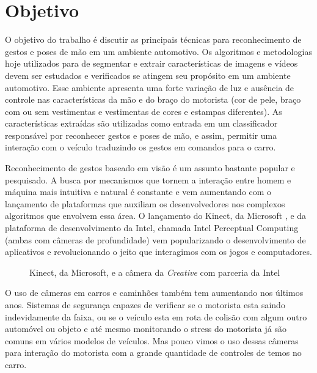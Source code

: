 \chapter{Objetivo}

O objetivo do trabalho é discutir as principais técnicas para reconhecimento de gestos e poses de mão em um ambiente automotivo.
Os algoritmos e metodologias hoje utilizados para de segmentar e extrair características de imagens e vídeos devem ser estudados e verificados se atingem seu propósito em um ambiente automotivo. Esse ambiente apresenta uma forte variação de luz e ausência de controle nas características da mão e do braço do motorista (cor de pele, braço com ou sem vestimentas e vestimentas de cores e estampas diferentes). As características extraídas são utilizadas como entrada em um classificador responsável por reconhecer gestos e poses de mão, e assim, permitir uma interação com o veículo traduzindo os gestos em comandos para o carro.


Reconhecimento de gestos baseado em visão é um assunto bastante popular e pesquisado. A busca por mecanismos que tornem a interação entre homem e máquina mais intuitiva e natural é constante e vem aumentando com o lançamento de plataformas que auxiliam os desenvolvedores nos complexos algoritmos que envolvem essa área.
O lançamento do Kinect, da Microsoft \cite{kinect}, e da plataforma de desenvolvimento da Intel, chamada Intel Perceptual Computing \cite{intel} (ambas com câmeras de profundidade) vem popularizando o desenvolvimento de aplicativos e revolucionando o jeito que interagimos com os jogos e computadores. 

\begin{figure}[ht!]
\centering
{}
  \caption{Kinect, da Microsoft, e a câmera da \textit{Creative} com parceria da Intel}
  \label{fig:depth_camera}
\end{figure}

O uso de câmeras em carros e caminhões também tem aumentando nos últimos anos. Sistemas de segurança capazes de verificar se o motorista esta saindo indevidamente da faixa, ou se o veículo esta em rota de colisão com algum outro automóvel ou objeto e até mesmo monitorando o stress do motorista já são comuns em vários modelos de veículos. Mas pouco vimos o uso dessas câmeras para interação do motorista com a grande quantidade de controles de temos no carro.


